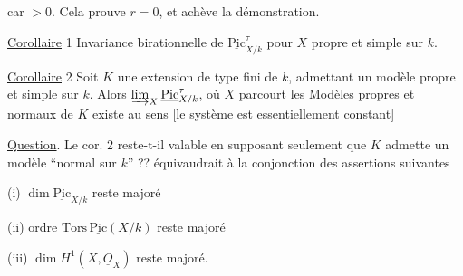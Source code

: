 car $>0$. Cela prouve $r=0$, et achève la
démonstration.

\uline{Corollaire} 1 Invariance birationnelle de $\underline{\mathrm{Pic}}^\tau_{X/k}$
pour $X$ propre et simple sur $k$.

\uline{Corollaire} 2 Soit $K$ une extension
 de type fini de $k$, admettant
un modèle  propre et \uline{simple}
sur $k$. Alors $\varinjlim_X\underline{\mathrm{Pic}}^\tau_{X/k}$, où $X$ parcourt
les Modèles propres et normaux  de $K$
existe au sens  [le système 
est essentiellement constant]

\uline{Question}. Le cor. 2 reste-t-il valable
en supposant seulement que $K$ admette
un modèle ``normal sur $k$'' ??  
 équivaudrait à la conjonction des
assertions suivantes

(i) $\dim\underline{\mathrm{Pic}}_{X/k}$ reste majoré

(ii) ordre $\mathrm{Tors}\,\underline{\mathrm{Pic}}(X/k)$ reste majoré

(iii) $\dim H^1(X,\underline{O}_X)$ reste majoré.
